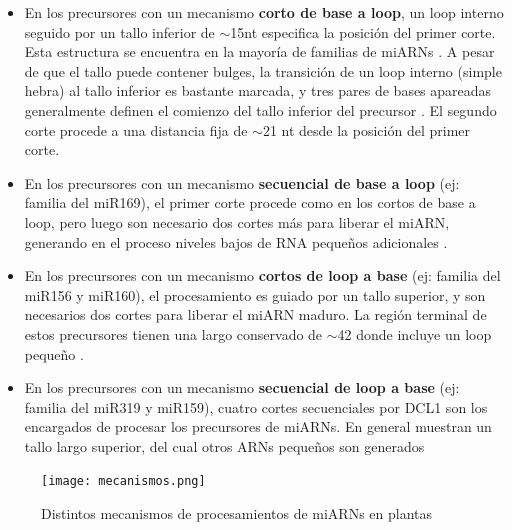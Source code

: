 \begin{itemize}
    \item En los precursores con un mecanismo \textbf{corto de base a loop}, un loop interno seguido por un tallo inferior de $\sim$15nt especifica la posición del primer corte.
        Esta estructura se encuentra en la mayoría de familias de miARNs \citep{Mateos2010,pmid20015653,pmid20015654}.
        A pesar de que el tallo puede contener bulges, la transición de un loop interno (simple hebra) al tallo inferior es bastante marcada, y tres pares de bases apareadas generalmente definen el comienzo del tallo inferior del precursor \citep{Bologna2013}.
        El segundo corte procede a una distancia fija de $\sim$21 nt desde la posición del primer corte.
    \item En los precursores con un mecanismo \textbf{secuencial de base a loop} (ej: familia del miR169), el primer corte procede como en los cortos de base a loop, pero luego son necesario dos cortes más para liberar el miARN, generando en el proceso niveles bajos de RNA pequeños adicionales \citep{Bologna2013}.
    \item En los precursores con un mecanismo \textbf{cortos de loop a base} (ej: familia del miR156 y miR160), el procesamiento es guiado por un tallo superior, y son necesarios dos cortes para liberar el miARN maduro.
        La región terminal de estos precursores tienen una largo conservado de $\sim$42 donde incluye un loop pequeño \citep{Bologna2013}.
    \item En los precursores con un mecanismo \textbf{secuencial de loop a base} (ej: familia del miR319 y miR159), cuatro cortes secuenciales por DCL1 son los encargados de procesar los precursores de miARNs.
        En general muestran un tallo largo superior, del cual otros ARNs pequeños son generados \citep{pmid19850910,Bologna2009,Bologna2013}
\end{itemize}

\begin{figure}[htbp!] 
    \centering    
    \texttt{[image: mecanismos.png]}
    \caption[Mecanismos de procesamiento]{Distintos mecanismos de procesamientos de miARNs en plantas}
    \label{fig:mecanismos}
\end{figure}



